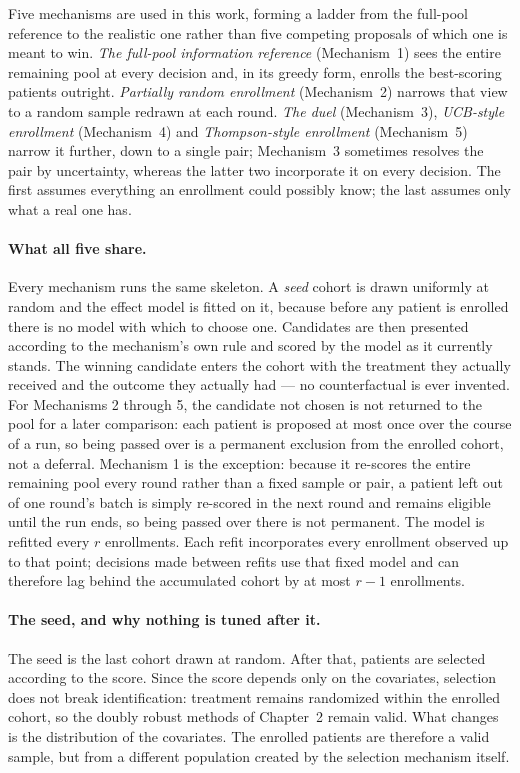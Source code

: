 Five mechanisms are used in this work, forming a ladder from the full-pool reference to the
realistic one rather than five competing proposals of which one is meant to win.
\emph{The full-pool information reference} (Mechanism~1) sees the entire remaining pool at every decision
and, in its greedy form, enrolls the best-scoring patients outright. \emph{Partially random enrollment}
(Mechanism~2) narrows that view to a random sample redrawn at each round. \emph{The
duel} (Mechanism~3), \emph{UCB-style enrollment} (Mechanism~4) and \emph{Thompson-style enrollment}
(Mechanism~5) narrow it further, down to a single pair; Mechanism~3 sometimes resolves the
pair by uncertainty, whereas the latter two incorporate it on every decision. The first assumes
everything an enrollment could possibly know; the last assumes only what a real one has.

\paragraph{What all five share.}
Every mechanism runs the same skeleton. A \emph{seed} cohort is drawn uniformly
at random and the effect model is fitted on it, because before any patient is
enrolled there is no model with which to choose one. Candidates are then
presented according to the mechanism's own rule and scored by the model as it
currently stands. The winning candidate enters the cohort with the treatment
they actually received and the outcome they actually had --- no counterfactual
is ever invented. For Mechanisms 2 through 5, the candidate not chosen is not
returned to the pool for a later comparison: each patient is proposed at most
once over the course of a run, so being passed over is a permanent exclusion
from the enrolled cohort, not a deferral. Mechanism 1 is the exception:
because it re-scores the entire remaining pool every round rather than a
fixed sample or pair, a patient left out of one round's batch is simply
re-scored in the next round and remains eligible until the run ends, so being
passed over there is not permanent. The model is refitted every $r$ enrollments. Each refit incorporates every enrollment
observed up to that point; decisions made between refits use that fixed model and can
therefore lag behind the accumulated cohort by at most $r-1$ enrollments.

\paragraph{The seed, and why nothing is tuned after it.}
The seed is the last cohort drawn at random. After that, patients are selected
according to the score. Since the score depends only on the covariates,
selection does not break identification: treatment remains randomized within
the enrolled cohort, so the doubly robust methods of Chapter~2 remain valid.
What changes is the distribution of the covariates. The enrolled patients are
therefore a valid sample, but from a different population created by the
selection mechanism itself.

